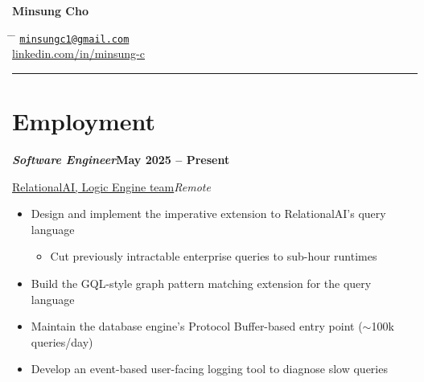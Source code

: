 \documentclass[11pt]{article} %
\begin{document}

\parbox{0.5\textwidth}{ %
\huge{\textbf{Minsung Cho}}
}
\hfill %
\parbox{0.5\textwidth}{ %
\begin{tabbing} %
\hspace{3cm} \= \hspace{4cm} \= \kill %
\href{mailto:minsungc1@gmail.com}{\texttt{minsungc1@gmail.com}} \\ %
\href{https://linkedin.com/in/minsung-c}{linkedin.com/in/minsung-c}
\end{tabbing}}

\hrule


\newcommand{\job}[7]{%
{\setlength{\parskip}{0pt}%
\par\noindent\textbf{\textit{#6}}\hfill\textbf{#1 #2}\par
\noindent\href{#5}{#3}\hfill\textit{#4}\par}
\nopagebreak
\vspace{-6pt}
\begin{itemize}\setlength{\itemsep}{0pt}\setlength{\parskip}{0pt}\setlength{\topsep}{0pt}\setlength{\parsep}{0pt}
    #7
\end{itemize}
\vspace{0.3em}
}

\section{Employment}

\job
{May 2025 --}{Present}
{RelationalAI, Logic Engine team}{Remote}
{http://relational.ai}
{Software Engineer}
{
    \item Design and implement the imperative extension to RelationalAI's query language
    \begin{itemize}
        \item Cut previously intractable enterprise queries to sub-hour runtimes
    \end{itemize}
    \item Build the GQL-style graph pattern matching extension for the query language
    \item Maintain the database engine's Protocol Buffer-based entry point ($\sim$100k queries/day)
    \item Develop an event-based user-facing logging tool to diagnose slow queries
}
\end{document}
